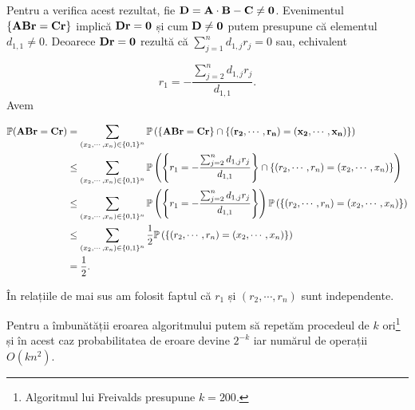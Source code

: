 \documentclass[]{article}
\let\rmarkdownfootnote\footnote%
\def\footnote{\protect\rmarkdownfootnote}
\begin{document}
Pentru a verifica acest rezultat, fie
\(\bf{D} = \bf{A}\cdot\bf{B}-\bf{C} \neq 0\). Evenimentul
\(\{\bf{A}\bf{B}\bf{r} = \bf{C}\bf{r}\}\) implică \(\bf{D}\bf{r}=0\) și
cum \(\bf{D}\neq 0\) putem presupune că elementul \(d_{1,1}\neq 0\).
Deoarece \(\bf{D}\bf{r}=0\) rezultă că \(\sum_{j=1}^{n}d_{1,j}r_j=0\)
sau, echivalent

\[
  r_1 = -\frac{\sum_{j=2}^{n}d_{1,j}r_j}{d_{1,1}}.
\] Avem

\begin{align*}
  \mathbb{P}(\bf{A}\bf{B}\bf{r} = \bf{C}\bf{r}) &= \sum_{(x_2,\cdots, x_n)\in\{0,1\}^n}\mathbb{P}\left(\{\bf{A}\bf{B}\bf{r} = \bf{C}\bf{r}\}\cap \{(r_2,\cdots, r_n) = (x_2,\cdots, x_n)\}\right)\\
      &\leq \sum_{(x_2,\cdots, x_n)\in\{0,1\}^n}\mathbb{P}\left(\left\{r_1 = -\frac{\sum_{j=2}^{n}d_{1,j}r_j}{d_{1,1}}\right\}\cap \{(r_2,\cdots, r_n) = (x_2,\cdots, x_n)\}\right)\\
      &\leq \sum_{(x_2,\cdots, x_n)\in\{0,1\}^n}\mathbb{P}\left(\left\{r_1 = -\frac{\sum_{j=2}^{n}d_{1,j}r_j}{d_{1,1}}\right\}\right)\mathbb{P}\left(\{(r_2,\cdots, r_n) = (x_2,\cdots, x_n)\}\right)\\
      &\leq \sum_{(x_2,\cdots, x_n)\in\{0,1\}^n}\frac{1}{2}\mathbb{P}\left(\{(r_2,\cdots, r_n) = (x_2,\cdots, x_n)\}\right)\\
      &= \frac{1}{2}.
\end{align*}

În relațiile de mai sus am folosit faptul că \(r_1\) și
\((r_2,\cdots, r_n)\) sunt independente.

Pentru a îmbunătății eroarea algoritmului putem să repetăm procedeul de
\(k\) ori\footnote{Algoritmul lui Freivalds presupune \(k = 200\).} și
în acest caz probabilitatea de eroare devine \(2^{-k}\) iar numărul de
operații \(O(kn^2)\).
\end{document}
